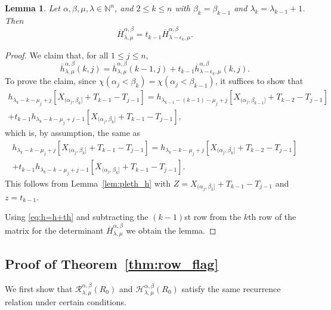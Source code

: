 \documentclass[12pt]{amsart}
\numberwithin{equation}{section}
\newtheorem{lem}[thm]{Lemma}
\theoremstyle{definition}
\newcommand\ovh{\overline{h}}
\newcommand\ovH{\overline{H}}
\newcommand\NN{\mathbb{N}}
\newcommand\R{\mathcal{R}}
\newcommand\HH{\mathcal{H}}
\begin{document}
\begin{lem}\label{lem:H=H+tH}
  Let $\alpha,\beta,\mu,\lambda\in\NN^n$, and $2\le k\le n$
  with $\beta_k=\beta_{k-1}$ and $\lambda_k=\lambda_{k-1}+1$. Then 
\[
  \ovH_{\lambda,\mu}^{\alpha,\beta} = t_{k-1}
  \ovH_{\lambda-\epsilon_k,\mu}^{\alpha,\beta}.
\]
\end{lem}
\begin{proof}
  We claim that, for all $1\le j\le n$,
  \begin{equation}\label{eq:h=h+th}
  \ovh_{\lambda,\mu}^{\alpha,\beta}(k,j)
  =\ovh_{\lambda,\mu}^{\alpha,\beta}(k-1,j)
  +t_{k-1} \ovh_{\lambda-\epsilon_k,\mu}^{\alpha,\beta}(k,j).
\end{equation}
To prove the claim, since $\chi(\alpha_j<\beta_k)=\chi(\alpha_j<\beta_{k-1})$,
it suffices to show that
  \begin{multline*}
    h_{\lambda_k-k-\mu_j+j}[X_{(\alpha_j,\beta_k]}+T_{k-1}-T_{j-1}]
    =h_{\lambda_{k-1}-(k-1)-\mu_j+j}[X_{(\alpha_j,\beta_{k-1}]}+T_{k-2}-T_{j-1}]\\
    +t_{k-1} h_{\lambda_k-k-\mu_j+j-1}[X_{(\alpha_j,\beta_k]}+T_{k-1}-T_{j-1}],
  \end{multline*}
  which is, by assumption, the same as
  \begin{multline*}
    h_{\lambda_k-k-\mu_j+j}[X_{(\alpha_j,\beta_k]}+T_{k-1}-T_{j-1}]
    =h_{\lambda_{k}-k-\mu_j+j}[X_{(\alpha_j,\beta_{k}]}+T_{k-2}-T_{j-1}]\\
    +t_{k-1} h_{\lambda_k-k-\mu_j+j-1}[X_{(\alpha_j,\beta_k]}+T_{k-1}-T_{j-1}].
  \end{multline*}
  This follows from Lemma~\ref{lem:pleth_h} with
  $Z=X_{(\alpha_j,\beta_k]}+T_{k-1}-T_{j-1}$ and $z=t_{k-1}$.

  Using \eqref{eq:h=h+th} and subtracting the $(k-1)$st row from the $k$th row
  of the matrix for the determinant $\ovH_{\lambda,\mu}^{\alpha,\beta}$ we
  obtain the lemma.
\end{proof}

\subsection{Proof of Theorem~\ref{thm:row_flag}}

We first show that $\R^{\alpha,\beta}_{\lambda,\mu}(R_0)$ and
$\HH^{\alpha,\beta}_{\lambda,\mu}(R_0)$ satisfy the same recurrence relation
under certain conditions.
\end{document}
